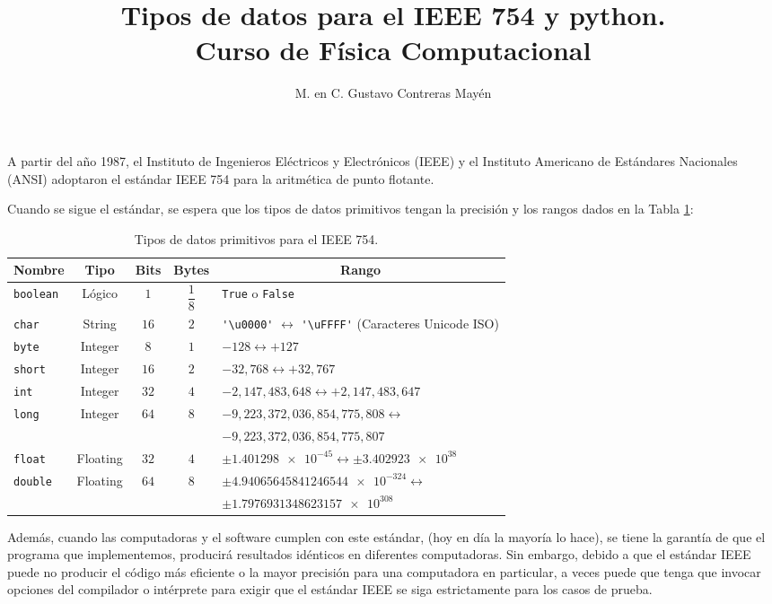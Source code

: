 \documentclass[11pt]{article}
\title{Tipos de datos para el IEEE 754 y python. \\ Curso de Física Computacional}
\author{M. en C. Gustavo Contreras Mayén}
\date{ }
\newcommand{\letraconsola}[1]{\texttt{#1}}
\begin{document}
\maketitle
\fontsize{14}{20}\selectfont
A partir del año 1987, el Instituto de Ingenieros Eléctricos y Electrónicos (IEEE) y el Instituto Americano de Estándares Nacionales (ANSI) adoptaron el estándar IEEE 754 para la aritmética de punto flotante.
\par
Cuando se sigue el estándar, se espera que los tipos de datos primitivos tengan la precisión y los rangos dados en la Tabla \ref{table:Tabla_01}:

\begin{table}[h]
\setlength{\extrarowheight}{10pt}
\centering
\begin{tabular}{l c c c p{9cm}}
Nombre & Tipo & Bits & Bytes & \multicolumn{1}{c}{Rango} \\ \hline
\letraconsola{boolean} & Lógico & $1$ & $\dfrac{1}{8}$ & \texttt{True} o \texttt{False} \\ \hline
\letraconsola{char} & String & $16$ & $2$ & \verb|'\u0000'| $\leftrightarrow$ \verb|'\uFFFF'| (Caracteres Unicode ISO) \\ \hline
\letraconsola{byte} & Integer & $8$ & $1$ & $-128 \leftrightarrow +127$ \\ \hline
\letraconsola{short} & Integer & $16$ & $2$ & $-32,768 \leftrightarrow +32,767$ \\ \hline
\letraconsola{int} & Integer & $32$ & $4$ & $-2,147,483,648 \leftrightarrow +2,147,483,647$ \\ \hline
\multirow{2}{*}{\letraconsola{long}} & \multirow{2}{*}{Integer} & \multirow{2}{*}{$64$} & \multirow{2}{*}{$8$} & $-9,223,372,036,854,775,808 \leftrightarrow$ \\
 & & & & $-9,223,372,036,854,775,807$ \\ \hline
\letraconsola{float} & Floating & $32$ & $4$ & $\pm \num{1.401298e-45} \leftrightarrow \pm \num{3.402923e+38}$ \\ \hline
\multirow{2}{*}{\letraconsola{double}} & \multirow{2}{*}{Floating} & \multirow{2}{*}{$64$} & \multirow{2}{*}{$8$} & $\pm \num{4.94065645841246544e-324} \leftrightarrow$ \\
& & & & $\pm \num{1.7976931348623157e+308}$ \\ \hline
\end{tabular}
\caption{Tipos de datos primitivos para el IEEE 754.}
\label{table:Tabla_01}
\end{table}
Además, cuando las computadoras y el software cumplen con este estándar, (hoy en día la mayoría lo hace), se tiene la garantía de que el programa que implementemos, producirá resultados idénticos en diferentes computadoras. Sin embargo, debido a que el estándar IEEE puede no producir el código más eficiente o la mayor precisión para una computadora en particular, a veces puede que tenga que invocar opciones del compilador o intérprete para exigir que el estándar IEEE se siga estrictamente para los casos de prueba.
\end{document}
